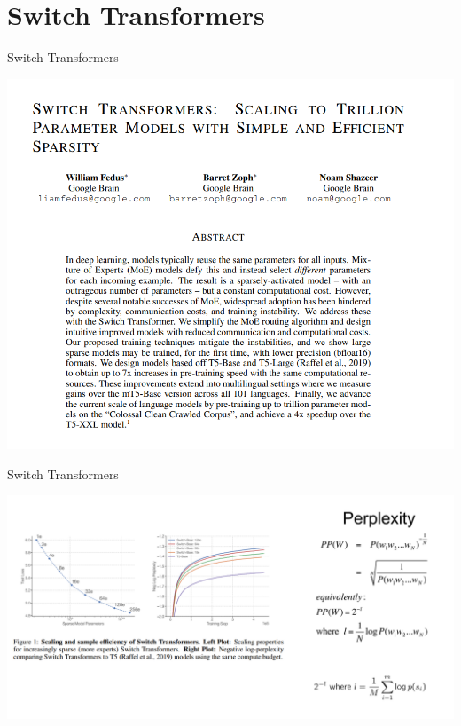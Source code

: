 \documentclass[aspectratio=169,xcolor=dvipsnames]{beamer}
\begin{document}
\section{Switch Transformers}

\begin{frame}{Switch Transformers}
\begin{center}
\includegraphics[scale=0.35]{switch1.png}    
\end{center} 
\end{frame}


\begin{frame}{Switch Transformers}
\begin{center}
\includegraphics[scale=0.35]{switch2.png}    
\end{center} 
\end{frame}
\end{document}

